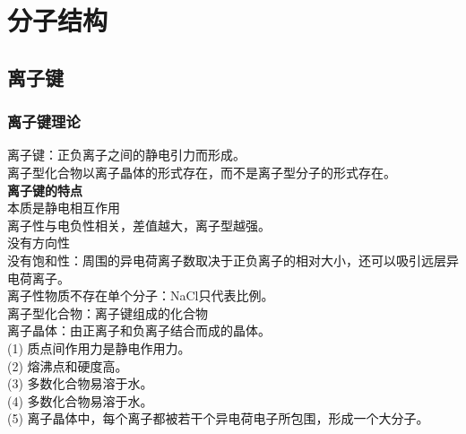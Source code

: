 \documentclass[utf8,a4paper,12pt]{ctexart}
\begin{document}
\newpage
\section{分子结构}
\subsection{离子键}
\subsubsection{离子键理论}
离子键：正负离子之间的静电引力而形成。\\
离子型化合物以离子晶体的形式存在，而不是离子型分子的形式存在。\\
{\bf 离子键的特点}\\
本质是静电相互作用\\
离子性与电负性相关，差值越大，离子型越强。\\
没有方向性\\
没有饱和性：周围的异电荷离子数取决于正负离子的相对大小，还可以吸引远层异电荷离子。\\
离子性物质不存在单个分子：NaCl只代表比例。\\
离子型化合物：离子键组成的化合物\\
离子晶体：由正离子和负离子结合而成的晶体。\\
(1) 质点间作用力是静电作用力。\\
(2) 熔沸点和硬度高。\\
(3) 多数化合物易溶于水。\\
(4) 多数化合物易溶于水。\\
(5) 离子晶体中，每个离子都被若干个异电荷电子所包围，形成一个大分子。\\
\end{document}
